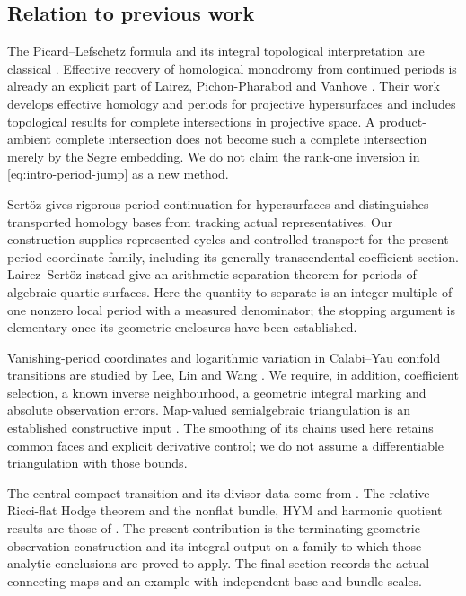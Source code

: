 \subsection{Relation to previous work}

The Picard--Lefschetz formula and its integral
topological interpretation are classical
\cite[Expos\'e~XIV]{Deligne}. Effective recovery of
homological monodromy from continued periods is
already an explicit part of Lairez, Pichon-Pharabod
and Vanhove \cite[\S3.5.2, equation~(38), arXiv-v2
text]{LPPV}. Their work develops effective homology
and periods for projective hypersurfaces and includes
topological results for complete intersections in
projective space. A product-ambient complete
intersection does not become such a complete
intersection merely by the Segre embedding.
We do not claim the rank-one inversion in
\eqref{eq:intro-period-jump} as a new method.

Sert\"oz \cite[\S\S1.3,1.6]{Sertoz} gives rigorous
period continuation for hypersurfaces and distinguishes
transported homology bases from tracking actual
representatives. Our construction supplies represented
cycles and controlled transport for the present
period-coordinate family, including its generally
transcendental coefficient section.
Lairez--Sert\"oz \cite[Theorem~17]{LairezSertoz}
instead give an arithmetic separation theorem for
periods of algebraic quartic surfaces. Here the
quantity to separate is an integer multiple of
one nonzero local period with a measured denominator;
the stopping argument is elementary once its
geometric enclosures have been established.

Vanishing-period coordinates and logarithmic
variation in Calabi--Yau conifold transitions are
studied by Lee, Lin and Wang
\cite[\S3.3 and Proposition~3.16]{LLW}.
We require, in addition, coefficient selection,
a known inverse neighbourhood, a geometric integral
marking and absolute observation errors.
Map-valued semialgebraic triangulation is an
established constructive input
\cite[Theorem~5.43 and Algorithm~11.44]{BPR}.
The smoothing of its chains used here retains
common faces and explicit derivative control;
we do not assume a differentiable triangulation
with those bounds.

The central compact transition and its divisor
data come from \cite{W_Toric,W_HodgeRay}.
The relative Ricci-flat Hodge theorem and the
nonflat bundle, HYM and harmonic quotient results
are those of \cite{W_Hodge,W_HYM}.
The present contribution is the terminating geometric
observation construction and its integral output
on a family to which those analytic conclusions
are proved to apply. The final section records
the actual connecting maps and an example with
independent base and bundle scales.
